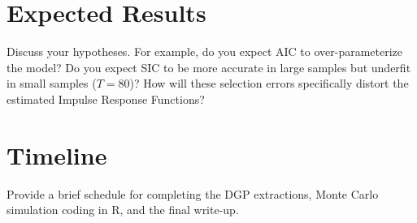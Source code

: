 \documentclass[12pt]{article}
\begin{document}
\section{Expected Results}
Discuss your hypotheses. For example, do you expect AIC to over-parameterize the model? Do you expect SIC to be more accurate in large samples but underfit in small samples ($T=80$)? How will these selection errors specifically distort the estimated Impulse Response Functions?

\section{Timeline}
Provide a brief schedule for completing the DGP extractions, Monte Carlo simulation coding in R, and the final write-up.

\newpage



\end{document}

